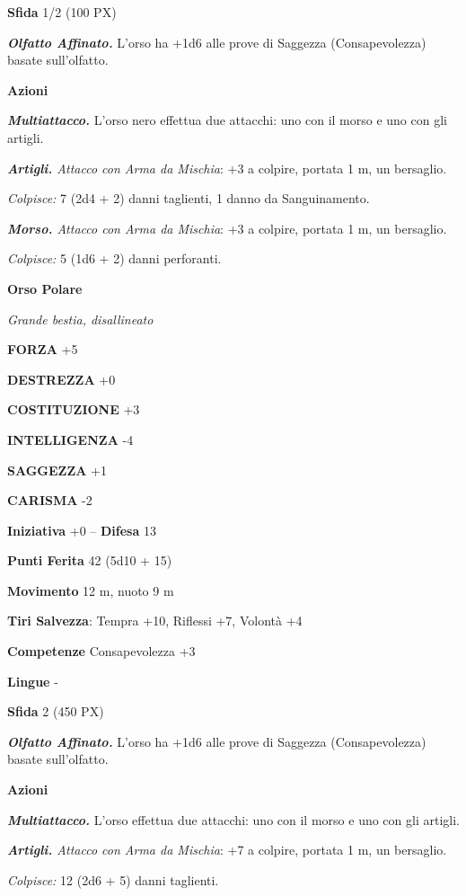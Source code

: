 \begin{multicols}{2}
	\textbf{Sfida} 1/2 (100 PX)

	\textit{\textbf{Olfatto Affinato.}} L'orso ha +1d6 alle prove di Saggezza (Consapevolezza) basate sull'olfatto.

	\textbf{Azioni}

	\textit{\textbf{Multiattacco.}} L'orso nero effettua due attacchi: uno con il morso e uno con gli artigli.

	\textit{\textbf{Artigli.} Attacco con Arma da Mischia}: +3 a colpire, portata 1 m, un bersaglio.

	\textit{Colpisce:} 7 (2d4 + 2) danni taglienti, 1 danno da Sanguinamento.

	\textit{\textbf{Morso.} Attacco con Arma da Mischia}: +3 a colpire, portata 1 m, un bersaglio.

	\textit{Colpisce:} 5 (1d6 + 2) danni perforanti.

	\medskip\textbf{Orso Polare}

	\textit{Grande bestia, disallineato}

	\textbf{FORZA} +5

	\textbf{DESTREZZA} +0

	\textbf{COSTITUZIONE} +3

	\textbf{INTELLIGENZA} -4

	\textbf{SAGGEZZA} +1

	\textbf{CARISMA} -2

	\textbf{Iniziativa} +0 -- \textbf{Difesa} 13

	\textbf{Punti Ferita} 42 (5d10 + 15)

	\textbf{Movimento} 12 m, nuoto 9 m

	\textbf{Tiri Salvezza}: Tempra +10, Riflessi +7, Volontà +4

	\textbf{Competenze} Consapevolezza +3

	\textbf{Lingue} -

	\textbf{Sfida} 2 (450 PX)

	\textit{\textbf{Olfatto Affinato.}} L'orso ha +1d6 alle prove di Saggezza (Consapevolezza) basate sull'olfatto.

	\textbf{Azioni}

	\textit{\textbf{Multiattacco.}} L'orso effettua due attacchi: uno con il morso e uno con gli artigli.

	\textit{\textbf{Artigli.} Attacco con Arma da Mischia}: +7 a colpire, portata 1 m, un bersaglio.

	\textit{Colpisce:} 12 (2d6 + 5) danni taglienti.


\end{multicols}
